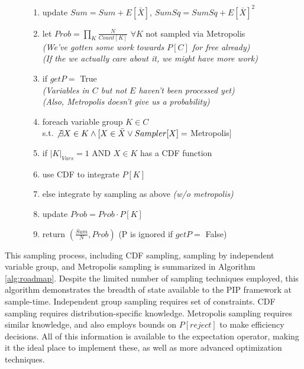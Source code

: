 \begin{figure}
\begin{algorithm}
\begin{enumerate}
\item \hspace*{0.2in} update $Sum = Sum + E[\bar X]$, $SumSq = SumSq + E[\bar X]^2$
\item \hspace*{0.1in} let $Prob = \prod_K \frac{N}{Count[K]}$ $\forall K$ not sampled via Metropolis
\\    \hspace*{0.1in} \textit{(We've gotten some work towards $P[C]$ for free already)}
\\    \hspace*{0.1in} \textit{(If the we actually care about it, we might have more work)}
\item \hspace*{0.1in} if $getP =$ True
\\    \hspace*{0.2in} \textit{(Variables in $C$ but not $E$ haven't been processed yet)}
\\    \hspace*{0.2in} \textit{(Also, Metropolis doesn't give us a probability)}
\item \hspace*{0.2in} foreach variable group $K \in C$ \\ \hspace*{0.5in}s.t. $\not\exists X \in K \wedge [X \in \bar X \vee Sampler[X] =$ Metropolis$]$ 
\item \hspace*{0.3in} if $|K|_{Vars} = 1$ AND $X\in K$ has a CDF function
\item \hspace*{0.4in} use CDF to integrate $P[K]$
\item \hspace*{0.3in} else integrate by sampling as above \textit{(w/o metropolis)}
\item \hspace*{0.3in} update $Prob = Prob \cdot P[K]$
\item \hspace*{0.1in} return $(\frac{Sum}{N}, Prob)$ (P is ignored if $getP =$ False)
\end{enumerate}
\end{algorithm}\vspace*{-0.2in}
\end{figure}

This sampling process, including CDF sampling, sampling by independent variable group, and Metropolis sampling is summarized in Algorithm \ref{alg:roadmap}.  Despite the limited number of sampling techniques employed, this algorithm demonstrates the breadth of state available to the PIP framework at sample-time.  Independent group sampling requires set of constraints.  CDF sampling requires distribution-specific knowledge.  Metropolis sampling requires similar knowledge, and also employs bounds on $P[reject]$ to make efficiency decisions.  All of this information is available to the expectation operator, making it the ideal place to implement these, as well as more advanced optimization techniques.

